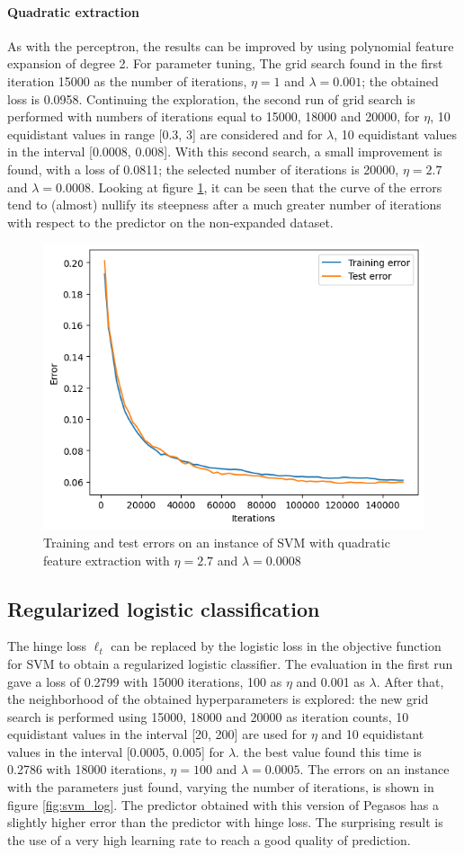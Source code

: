 \documentclass{article}
\begin{document}
\paragraph{Quadratic extraction}
As with the perceptron, the results can be improved by using polynomial feature expansion of degree 2. For parameter tuning, The grid search found in the first iteration 15000 as the number of iterations, $\eta=1$ and $\lambda=0.001$; the obtained loss is 0.0958. Continuing the exploration, the second run of grid search is performed with numbers of iterations equal to 15000, 18000 and 20000, for $\eta$, 10 equidistant values in range [0.3, 3] are considered and for $\lambda$, 10 equidistant values in the interval [0.0008, 0.008]. With this second search, a small improvement is found, with a loss of 0.0811; the selected number of iterations is 20000, $\eta=2.7$ and $\lambda=0.0008$. Looking at figure \ref{fig:quad_svm}, it can be seen that the curve of the errors tend to (almost) nullify its steepness after a much greater number of iterations with respect to the predictor on the non-expanded dataset.
\begin{figure}
	\centering
	\includegraphics[width=0.6\columnwidth]{../plots/quad_svm.png}
	\caption{Training and test errors on an instance of SVM with quadratic feature extraction with  $\eta=2.7$ and $\lambda=0.0008$}
	\label{fig:quad_svm}
\end{figure}

\subsection{Regularized logistic classification}
The hinge loss $\ell_t$ can be replaced by the logistic loss in the objective function for SVM to obtain a regularized logistic classifier. The evaluation in the first run gave a loss of 0.2799 with 15000 iterations, 100 as $\eta$ and 0.001 as $\lambda$. After that, the neighborhood of the obtained hyperparameters is explored: the new grid search is performed using 15000, 18000 and 20000 as iteration counts, 10 equidistant values in the interval [20, 200] are used for $\eta$ and 10 equidistant values in the interval [0.0005, 0.005] for $\lambda$. the best value found this time is 0.2786 with 18000 iterations, $\eta=100$ and $\lambda=0.0005 $. The errors on an instance with the parameters just found, varying the number of iterations, is shown in figure \ref{fig:svm_log}. The predictor obtained with this version of Pegasos has a slightly higher error than the predictor with hinge loss. The surprising result is the use of a very high learning rate to reach a good quality of prediction.
\end{document}
